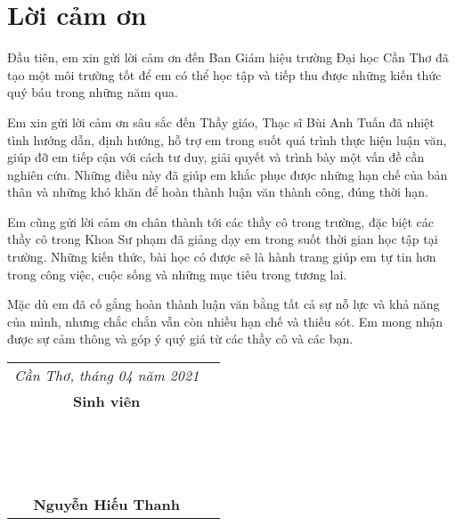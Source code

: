 \chapter*{Lời cảm ơn}

Đầu tiên, em xin gửi lời cảm ơn đến Ban Giám hiệu trường Đại học Cần Thơ đã tạo một môi trường tốt để em có thể học tập và tiếp thu được những kiến thức quý báu trong những năm qua.\par
Em xin gửi lời cảm ơn sâu sắc đến Thầy giáo, Thạc sĩ Bùi Anh Tuấn đã nhiệt tình hướng dẫn, định hướng, hỗ trợ em trong suốt quá trình thực hiện luận văn, giúp đỡ em tiếp cận với cách tư duy, giải quyết và trình bày một vấn đề cần nghiên cứu. Những điều này đã giúp em khắc phục được những hạn chế của bản thân và những khó khăn để hoàn thành luận văn thành công, đúng thời hạn.\par
Em cũng gửi lời cảm ơn chân thành tới các thầy cô trong trường, đặc biệt các thầy cô trong Khoa Sư phạm đã giảng dạy em trong suốt thời gian học tập tại trường. Những kiến thức, bài học có được sẽ là hành trang giúp em tự tin hơn trong công việc, cuộc sống và những mục tiêu trong tương lai.\par
Mặc dù em đã cố gắng hoàn thành luận văn bằng tất cả sự nỗ lực và khả năng của mình, nhưng chắc chắn vẫn còn nhiều hạn chế và thiếu sót. Em mong nhận được sự cảm thông và góp ý quý giá từ các thầy cô và các bạn.\par

\begin{flushright}
\begin{tabular}{Sc}
	\textit{Cần Thơ, tháng 04 năm 2021}\\
	\textbf{Sinh viên}\\
	~\\~\\~\\
	\textbf{Nguyễn Hiếu Thanh}\\
\end{tabular}
\end{flushright}\par
